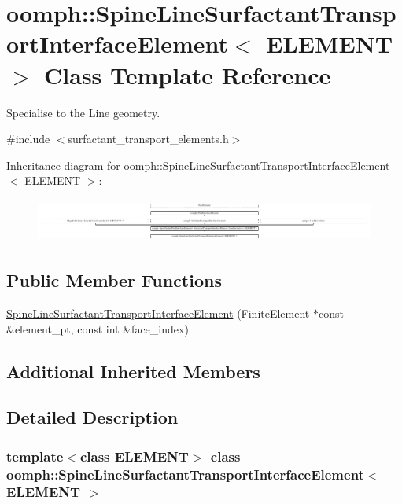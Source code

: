 \hypertarget{classoomph_1_1SpineLineSurfactantTransportInterfaceElement}{}\section{oomph\+:\+:Spine\+Line\+Surfactant\+Transport\+Interface\+Element$<$ E\+L\+E\+M\+E\+NT $>$ Class Template Reference}
\label{classoomph_1_1SpineLineSurfactantTransportInterfaceElement}


Specialise to the Line geometry.  




{\ttfamily \#include $<$surfactant\+\_\+transport\+\_\+elements.\+h$>$}

Inheritance diagram for oomph\+:\+:Spine\+Line\+Surfactant\+Transport\+Interface\+Element$<$ E\+L\+E\+M\+E\+NT $>$\+:\begin{figure}[H]
\begin{center}
\leavevmode
\includegraphics[height=1.435897cm]{classoomph_1_1SpineLineSurfactantTransportInterfaceElement}
\end{center}
\end{figure}
\subsection*{Public Member Functions}
\begin{DoxyCompactItemize}
\item 
\hyperlink{classoomph_1_1SpineLineSurfactantTransportInterfaceElement_a0b9ae72a734043e18ef9fc55629de3b6}{Spine\+Line\+Surfactant\+Transport\+Interface\+Element} (Finite\+Element $\ast$const \&element\+\_\+pt, const int \&face\+\_\+index)
\end{DoxyCompactItemize}
\subsection*{Additional Inherited Members}


\subsection{Detailed Description}
\subsubsection*{template$<$class E\+L\+E\+M\+E\+NT$>$\newline
class oomph\+::\+Spine\+Line\+Surfactant\+Transport\+Interface\+Element$<$ E\+L\+E\+M\+E\+N\+T $>$}

